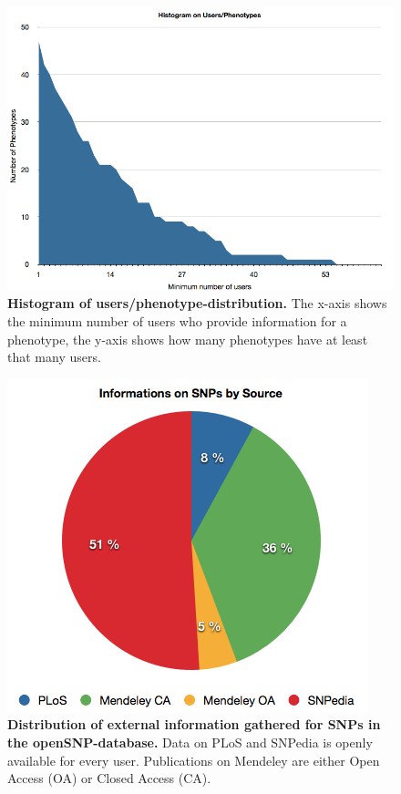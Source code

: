 \documentclass[10pt]{article}
\begin{document}
\begin{figure}[!ht]
	\begin{center}
		\includegraphics[scale=0.40]{histogram_phenotypes.png}
	\end{center}
	\caption{
	{\bf Histogram of users/phenotype-distribution.} The x-axis shows the minimum number of users who provide information for a phenotype, the y-axis shows how many phenotypes have at least that many users.}
	\label{Figure2_label}
\end{figure}

\begin{figure}[!ht]
	\begin{center}
		\includegraphics[scale=0.50]{paper_distribution.png}
	\end{center}
	\caption{
	{\bf Distribution of external information gathered for SNPs in the openSNP-database.} Data on PLoS and SNPedia is openly available for every user. Publications on Mendeley are either Open Access (OA) or Closed Access (CA).} 
	\label{Figure3_label}
\end{figure}
\end{document}
